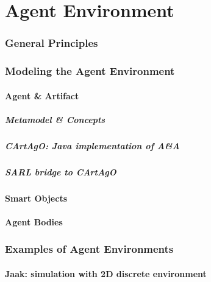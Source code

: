 \part{Agent Environment}
\begin{bibliographysection}

	\section{General Principles}
	

	\section{Modeling the Agent Environment}
	
	\subsection{Agent \& Artifact}
	\subsubsection{Metamodel \& Concepts}
	
	\subsubsection{{CArtAgO:} Java implementation of A\&A}
	
	\subsubsection{SARL bridge to {CArtAgO}}
	

	\subsection{Smart Objects}
	

	\subsection{Agent Bodies}
	

	\section{Examples of Agent Environments}
	
	\subsection[2D Environment]{{Jaak:} simulation with {2D} discrete environment}

\end{bibliographysection}
